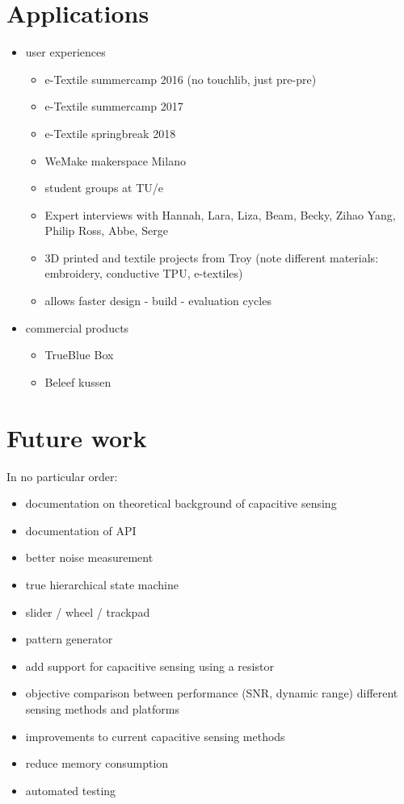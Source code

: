 \documentclass[format=sigchi, screen=true, review=true]{acmart}
\begin{document}
\section{Applications}
\begin{itemize}
\item user experiences
	\begin{itemize}
	\item e-Textile summercamp 2016 (no touchlib, just pre-pre)
	\item e-Textile summercamp 2017
	\item e-Textile springbreak 2018
	\item WeMake makerspace Milano
	\item student groups at TU/e
	\item Expert interviews with Hannah, Lara, Liza, Beam, Becky, Zihao Yang, Philip Ross, Abbe, Serge
	\item 3D printed and textile projects from Troy (note different materials: embroidery, conductive TPU, e-textiles)
	\item allows faster design - build - evaluation cycles 
\end{itemize}
\item commercial products
	\begin{itemize}
	\item TrueBlue Box
	\item Beleef kussen
	\end{itemize}
\end{itemize}

\section{Future work}
In no particular order:
\begin{itemize}
\item documentation on theoretical background of capacitive sensing
\item documentation of API
\item better noise measurement
\item true hierarchical state machine
\item slider / wheel / trackpad
\item pattern generator
\item add support for capacitive sensing using a resistor
\item objective comparison between performance (SNR, dynamic range) different sensing methods and platforms
\item improvements to current capacitive sensing methods
\item reduce memory consumption
\item automated testing
\end{itemize}
\end{document}
